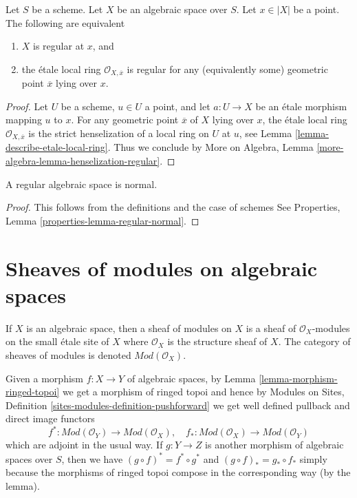 \begin{lemma}
\label{lemma-regular-at-x}
Let $S$ be a scheme. Let $X$ be an algebraic space over $S$.
Let $x \in |X|$ be a point. The following are equivalent
\begin{enumerate}
\item $X$ is regular at $x$, and
\item the \'etale local ring $\mathcal{O}_{X, \overline{x}}$ is
regular for any (equivalently some) geometric point $\overline{x}$
lying over $x$.
\end{enumerate}
\end{lemma}

\begin{proof}
Let $U$ be a scheme, $u \in U$ a point, and let $a : U \to X$ be an
\'etale morphism mapping $u$ to $x$. For any geometric point
$\overline{x}$ of $X$ lying over $x$, the \'etale local
ring $\mathcal{O}_{X, \overline{x}}$ is the strict henselization of
a local ring on $U$ at $u$, see
Lemma \ref{lemma-describe-etale-local-ring}.
Thus we conclude by
More on Algebra, Lemma \ref{more-algebra-lemma-henselization-regular}.
\end{proof}

\begin{lemma}
\label{lemma-regular-normal}
A regular algebraic space is normal.
\end{lemma}

\begin{proof}
This follows from the definitions and the case of schemes
See Properties, Lemma \ref{properties-lemma-regular-normal}.
\end{proof}

 








\section{Sheaves of modules on algebraic spaces}
\label{section-modules}

\noindent
If $X$ is an algebraic space, then a sheaf of modules on $X$ is
a sheaf of $\mathcal{O}_X$-modules on the small \'etale site of $X$
where $\mathcal{O}_X$ is the structure sheaf of $X$. The category
of sheaves of modules is denoted $\textit{Mod}(\mathcal{O}_X)$.

\medskip\noindent
Given a morphism $f : X \to Y$ of algebraic spaces, by
Lemma \ref{lemma-morphism-ringed-topoi}
we get a morphism of ringed topoi and hence by
Modules on Sites, Definition \ref{sites-modules-definition-pushforward}
we get well defined pullback and direct image functors
\begin{equation}
\label{equation-push-pull}
f^* :
\textit{Mod}(\mathcal{O}_Y)
\longrightarrow
\textit{Mod}(\mathcal{O}_X), \quad
f_* :
\textit{Mod}(\mathcal{O}_X)
\longrightarrow
\textit{Mod}(\mathcal{O}_Y)
\end{equation}
which are adjoint in the usual way. If $g : Y \to Z$ is another morphism
of algebraic spaces over $S$, then we have
$(g \circ f)^* = f^* \circ g^*$ and $(g \circ f)_* = g_* \circ f_*$
simply because the morphisms of ringed topoi compose in the corresponding
way (by the lemma).

